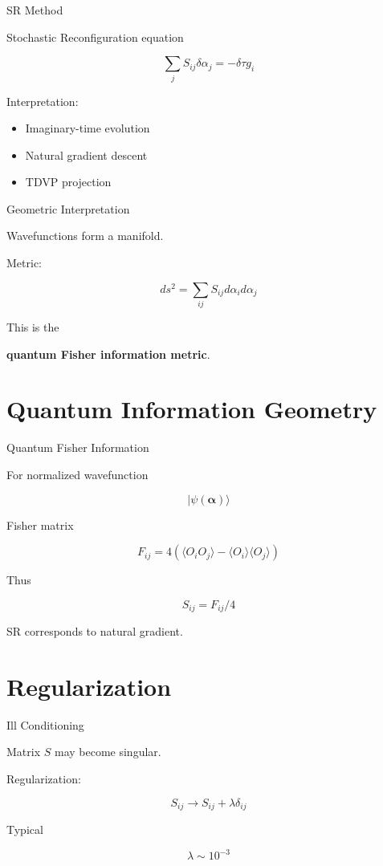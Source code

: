 \documentclass{beamer}
\begin{document}
\begin{frame}{SR Method}

Stochastic Reconfiguration equation

\[
\sum_j S_{ij}\delta\alpha_j = -\delta\tau g_i
\]

Interpretation:

\begin{itemize}
\item Imaginary-time evolution
\item Natural gradient descent
\item TDVP projection
\end{itemize}
\end{frame}

\begin{frame}{Geometric Interpretation}

Wavefunctions form a manifold.

Metric:

\[
ds^2 =
\sum_{ij} S_{ij} d\alpha_i d\alpha_j
\]

This is the

\textbf{quantum Fisher information metric}.
\end{frame}

\section{Quantum Information Geometry}

\begin{frame}{Quantum Fisher Information}

For normalized wavefunction

\[
|\psi(\bm{\alpha})\rangle
\]

Fisher matrix

\[
F_{ij} =
4(\langle O_i O_j\rangle
-
\langle O_i\rangle\langle O_j\rangle)
\]

Thus

\[
S_{ij} = F_{ij}/4
\]

SR corresponds to natural gradient.
\end{frame}

\section{Regularization}

\begin{frame}{Ill Conditioning}

Matrix \(S\) may become singular.

Regularization:

\[
S_{ij} \rightarrow S_{ij} + \lambda \delta_{ij}
\]

Typical

\[
\lambda \sim 10^{-3}
\]
\end{frame}
\end{document}
